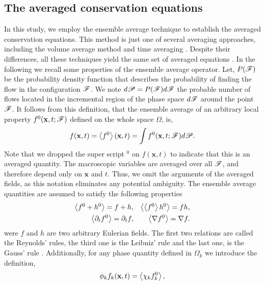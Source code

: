 \subsection{The averaged conservation equations}
\label{sec:avg_def}
In this study, we employ the ensemble average technique to establish the averaged conservation equations. 
This method is just one of several averaging approaches, including the volume average method \citep{jackson1997locally} and time averaging \citep{ishii2010thermo}. 
Despite their differences, all these techniques yield the same set of averaged equations \citep{jackson1997locally,zhang1997momentum}.
In the following we recall some properties of the ensemble average operator. 
Let, $P(\mathscr{F})$ be the probability density function that describes the probability of finding the flow in the configuration $\mathscr{F}$. 
We note $d\mathscr{P} = P(\mathscr{F}) d\mathscr{F}$ the probable number of flows located in the incremental region of the phase space $d\mathscr{F}$ around the point $\mathscr{F}$. 
It follows from this definition, that the ensemble average of an arbitrary local property $f^0(\textbf{x},t;\mathscr{F})$ defined on the whole space $\Omega$, is,
\begin{equation}
    f(\textbf{x},t)
    = \left<f^0\right>(\textbf{x},t)
    =\int f^0(\textbf{x},t;\mathscr{F}) d\mathscr{P}. 
    \label{eq:avg}
\end{equation}  
Note that we dropped the super script $^0$ on $f(\textbf{x},t)$ to indicate that this is an averaged quantity. 
The macroscopic variables are averaged over all $\mathscr{F}$, and therefore depend only on $\textbf{x}$ and $t$.
Thus, we omit the arguments of the averaged fields, as this notation eliminates any potential ambiguity. 
The ensemble average quantities are assumed to satisfy the following properties \citep{drew1983mathematical}
\begin{align}
    \left<f^0+h^0\right> = f+h, 
    && \left<\left<f^0\right>h^0\right> = fh, \nonumber\\
    \left<\partial_t f^0\right> 
    = \partial_t f,  
    &&\left<\mathbf{\nabla} f^0\right>
    = \mathbf{\nabla} f. 
    \label{eq:avg_properties}
\end{align}
were $f$ and $h$ are two arbitrary Eulerian fields. 
The first two relations are called the Reynolds' rules, the third one is the Leibniz' rule and the last one, is the Gauss' rule \citep{drew1983mathematical}.
Additionally, for any phase quantity defined in $\Omega_k$ we introduce the definition, 
\begin{equation}
    \phi_k f_k (\textbf{x},t) = \left<\chi_k f_k^0\right>,
    \label{eq:1_avg}
\end{equation}
